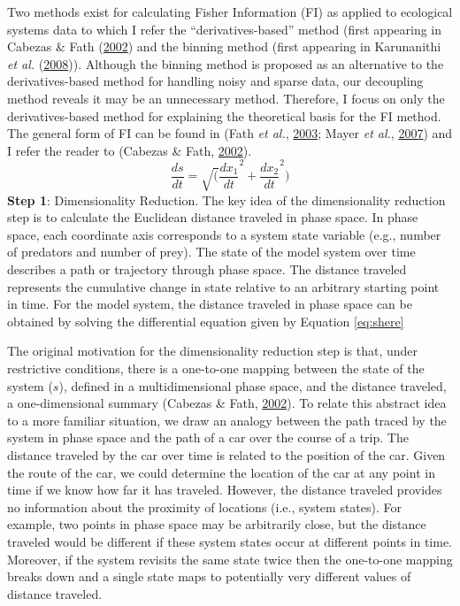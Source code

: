 \documentclass[print]{nuthesis}
\begin{document}
Two methods exist for calculating Fisher Information (FI) as applied to ecological systems data to which I refer the ``derivatives-based'' method (first appearing in Cabezas \& Fath (\protect\hyperlink{ref-cabezas_towards_2002}{2002}) and the binning method (first appearing in Karunanithi \emph{et al.} (\protect\hyperlink{ref-karunanithi_detection_2008}{2008})). Although the binning method is proposed as an alternative to the derivatives-based method for handling noisy and sparse data, our decoupling method reveals it may be an unnecessary method. Therefore, I focus on only the derivatives-based method for explaining the theoretical basis for the FI method. The general form of FI can be found in (Fath \emph{et al.}, \protect\hyperlink{ref-fath_regime_2003}{2003}; Mayer \emph{et al.}, \protect\hyperlink{ref-mayer_applications_2007}{2007}) and I refer the reader to (Cabezas \& Fath, \protect\hyperlink{ref-cabezas_towards_2002}{2002}).
\begin{equation}  
\frac{ds}{dt} = \sqrt(\frac{dx_1}{dt}^2 + \frac{dx_2}{dt}^2)
\label{eq:shere}
\end{equation}
\textbf{Step 1}: Dimensionality Reduction. The key idea of the dimensionality reduction step is to calculate the Euclidean distance traveled in phase space. In phase space, each coordinate axis corresponds to a system state variable (e.g., number of predators and number of prey). The state of the model system over time describes a path or trajectory through phase space. The distance traveled represents the cumulative change in state relative to an arbitrary starting point in time. For the model system, the distance traveled in phase space can be obtained by solving the differential equation given by Equation \eqref{eq:shere}

The original motivation for the dimensionality reduction step is that, under restrictive conditions, there is a one-to-one mapping between the state of the system (\(s\)), defined in a multidimensional phase space, and the distance traveled, a one-dimensional summary (Cabezas \& Fath, \protect\hyperlink{ref-cabezas_towards_2002}{2002}). To relate this abstract idea to a more familiar situation, we draw an analogy between the path traced by the system in phase space and the path of a car over the course of a trip. The distance traveled by the car over time is related to the position of the car. Given the route of the car, we could determine the location of the car at any point in time if we know how far it has traveled. However, the distance traveled provides no information about the proximity of locations (i.e., system states). For example, two points in phase space may be arbitrarily close, but the distance traveled would be different if these system states occur at different points in time. Moreover, if the system revisits the same state twice then the one-to-one mapping breaks down and a single state maps to potentially very different values of distance traveled.
\end{document}
